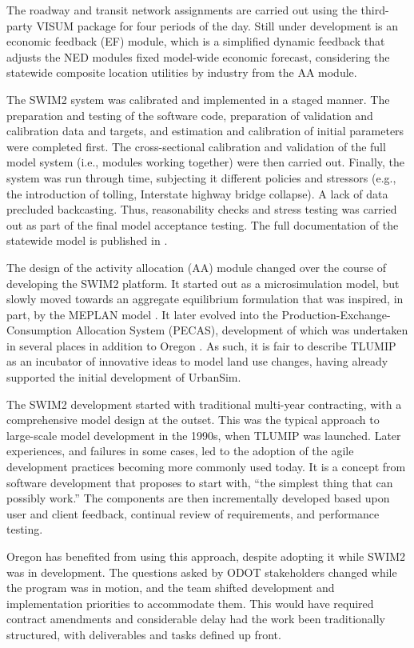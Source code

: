 The roadway and transit network assignments are carried out using the third-party VISUM package for four periods of the day. Still under development is an economic feedback (EF) module, which is a simplified dynamic feedback that adjusts the NED modules fixed model-wide economic forecast, considering the statewide composite location utilities by industry from the AA module.

The SWIM2 system was calibrated and implemented in a staged manner. The preparation and testing of the software code, preparation of validation and calibration data and targets, and estimation and calibration of initial parameters were completed first. The cross-sectional calibration and validation of the full model system (i.e., modules working together) were then carried out. Finally, the system was run through time, subjecting it different policies and stressors (e.g., the introduction of tolling, Interstate highway bridge collapse). A lack of data precluded backcasting. Thus, reasonability checks and stress testing was carried out as part of the final model acceptance testing. The full documentation of the statewide model is published in \cite{donnelly17}.

The design of the activity allocation (AA) module changed over the course of developing the SWIM2 platform. It started out as a microsimulation model, but slowly moved towards an aggregate equilibrium formulation that was inspired, in part, by the MEPLAN model \citep{echenique07}. It later evolved into the Production-Exchange-Consumption Allocation System (PECAS), development of which was undertaken in several places in addition to Oregon \citep{hunt05}. As such, it is fair to describe TLUMIP as an incubator of innovative ideas to model land use changes, having already supported the initial development of UrbanSim.

The SWIM2 development started with traditional multi-year contracting, with a comprehensive model design at the outset. This was the typical approach to large-scale model development in the 1990s, when TLUMIP was launched. Later experiences, and failures in some cases, led to the adoption of the agile development practices becoming more commonly used today. It is a concept from software development that proposes to start with, ``the simplest thing that can possibly work.'' The components are then incrementally developed based upon user and client feedback, continual review of requirements, and performance testing. 

Oregon has benefited from using this approach, despite adopting it while SWIM2 was in development. The questions asked by ODOT stakeholders changed while the program was in motion, and the team shifted development and implementation priorities to accommodate them. This would have required contract amendments and considerable delay had the work been traditionally structured, with deliverables and tasks defined up front.

